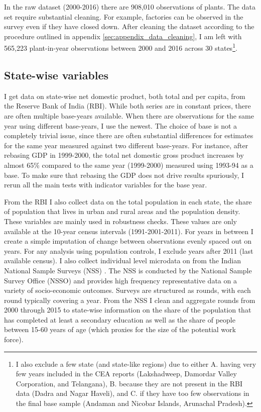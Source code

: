 \documentclass[11pt]{article}
\begin{document}
In the raw dataset (2000-2016) there are 908,010 observations of plants. The data set require substantial cleaning. For example, factories can be observed in the survey even if they have closed down. After cleaning the dataset according to the procedure outlined in appendix \ref{sec:appendix_data_cleaning}, I am left with 565,223 plant-in-year observations between 2000 and 2016 across 30 states\footnote{I also exclude a few state (and state-like regions) due to either A. having very few years included in the CEA reports (Lakshadweep, Damordar Valley Corporation, and Telangana), B. because they are not present in the RBI data (Dadra and Nagar Haveli), and C. if they have too few observations in the final base sample (Andaman and Nicobar Islands, Arunachal Pradesh).}.

\subsection{State-wise variables}%
\label{sub:state_wise_variables}

I get data on state-wise net domestic product, both total and per capita, from the Reserve Bank of India (RBI). While both series are in constant prices, there are often multiple base-years available. When there are observations for the same year using different base-years, I use the newest. The choice of base is not a completely trivial issue, since there are often substantial differences for estimates for the same year measured against two different base-years. For instance, after rebasing GDP in 1999-2000, the total net domestic gross product increases by almost 65\% compared to the same year (1999-2000) measured using 1993-94 as a base. To make sure that rebasing the GDP does not drive results spuriously, I rerun all the main tests with indicator variables for the base year.

From the RBI I also collect data on the total population in each state, the share of population that lives in urban and rural areas and the population density. These variables are mainly used in robustness checks. These values are only available at the 10-year census intervals (1991-2001-2011). For years in between I create a simple imputation of change between observations evenly spaced out on years. For any analysis using population controls, I exclude years after 2011 (last available census). 
I also collect individual level microdata on from the Indian National Sample Surveys (NSS) \citep{nsso_national_2000}. The NSS is conducted by the National Sample Survey Office (NSSO) and provides high frequency representative data on a variety of socio-economic outcomes. Surveys are structured as rounds, with each round typically covering a year. From the NSS I clean and aggregate rounds from 2000 through 2015 to state-wise information on the share of the population that has completed at least a secondary education as well as the share of people between 15-60 years of age (which proxies for the size of the potential work force).
\end{document}
